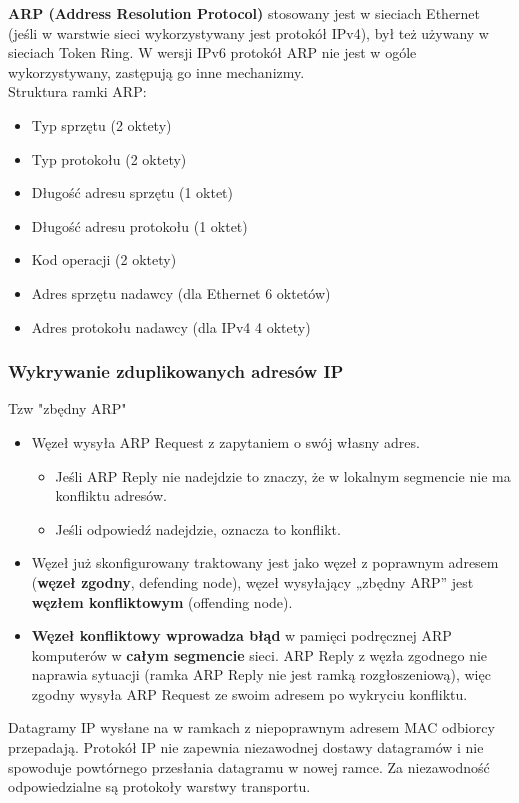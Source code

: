 \documentclass[../main.tex]{subfiles}
\begin{document}
    \textbf{ARP (Address Resolution Protocol)} stosowany jest w sieciach Ethernet (jeśli w warstwie sieci wykorzystywany jest protokół
    IPv4), był też używany w sieciach Token Ring. W wersji IPv6 protokół ARP nie jest w ogóle wykorzystywany, zastępują go inne mechanizmy.\\

    Struktura ramki ARP:
    \begin{itemize}
        \item Typ sprzętu (2 oktety)
        \item Typ protokołu (2 oktety)
        \item Długość adresu sprzętu (1 oktet)
        \item Długość adresu protokołu (1 oktet)
        \item Kod operacji (2 oktety)
        \item Adres sprzętu nadawcy (dla Ethernet 6 oktetów)
        \item Adres protokołu nadawcy (dla IPv4 4 oktety)
    \end{itemize}

    \subsubsection{Wykrywanie zduplikowanych adresów IP}
    Tzw "zbędny ARP"
    \begin{itemize}
        \item Węzeł wysyła ARP Request z zapytaniem o swój własny adres.
        \begin{itemize}
            \item Jeśli ARP Reply nie nadejdzie to znaczy, że w lokalnym segmencie nie ma konfliktu adresów.
            \item Jeśli odpowiedź nadejdzie, oznacza to konflikt.
        \end{itemize}
        \item Węzeł już skonfigurowany traktowany jest jako węzeł z poprawnym adresem (\textbf{węzeł zgodny}, defending node), węzeł
        wysyłający „zbędny ARP” jest \textbf{węzłem konfliktowym} (offending node).
        \item \textbf{Węzeł konfliktowy wprowadza błąd} w pamięci podręcznej ARP komputerów w \textbf{całym segmencie} sieci. ARP Reply z węzła zgodnego nie naprawia sytuacji (ramka ARP Reply nie jest ramką rozgłoszeniową), więc zgodny wysyła ARP Request ze swoim adresem po wykryciu konfliktu.
    \end{itemize}
    Datagramy IP wysłane na w ramkach z niepoprawnym adresem MAC odbiorcy
    przepadają. Protokół IP nie zapewnia niezawodnej dostawy datagramów i nie
    spowoduje powtórnego przesłania datagramu w nowej ramce. Za niezawodność
    odpowiedzialne są protokoły warstwy transportu.
\end{document}
